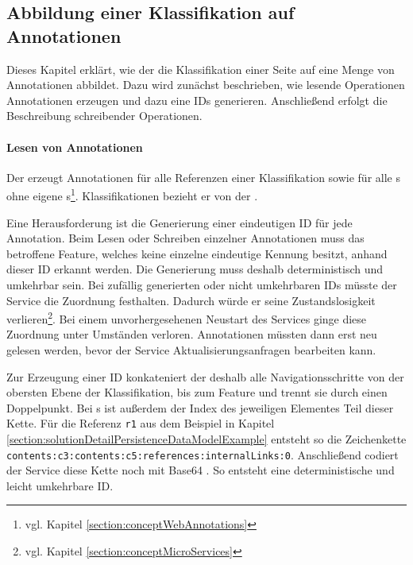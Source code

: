 \subsection{Abbildung einer Klassifikation auf Annotationen}
    \label{section:solutionDetailsAnnotationServiceMapping}
    Dieses Kapitel erklärt, wie der {\annotationService}
    die Klassifikation einer Seite auf eine Menge von Annotationen abbildet.
    Dazu wird zunächst beschrieben, wie lesende Operationen Annotationen
    erzeugen und dazu eine IDs generieren.
    Anschließend erfolgt die Beschreibung schreibender Operationen.

    \paragraph{Lesen von Annotationen}
    Der {\annotationService} erzeugt Annotationen für alle Referenzen einer Klassifikation
    sowie für alle {\contentFeature}s ohne eigene
    {\contentFeature}s\footnote{vgl. Kapitel \ref{section:conceptWebAnnotations}}.
    Klassifikationen bezieht er von der {\classificationStorageAPI}.

    Eine Herausforderung ist die Generierung einer eindeutigen ID für jede Annotation.
    Beim Lesen oder Schreiben einzelner Annotationen muss das betroffene
    Feature, welches keine einzelne eindeutige Kennung besitzt, anhand dieser ID erkannt werden.
    Die Generierung muss deshalb deterministisch und umkehrbar sein.
    Bei zufällig generierten oder nicht umkehrbaren IDs müsste der Service
    die Zuordnung festhalten.
    Dadurch würde er seine Zustandslosigkeit
    verlieren\footnote{vgl. Kapitel \ref{section:conceptMicroServices}}.
    Bei einem unvorhergesehenen Neustart des Services ginge diese Zuordnung unter Umständen verloren.
    Annotationen müssten dann erst neu gelesen werden,
    bevor der Service Aktualisierungsanfragen bearbeiten kann.

    Zur Erzeugung einer ID konkateniert der {\annotationService} deshalb
    alle Navigationsschritte von der obersten Ebene der Klassifikation,
    bis zum Feature und trennt sie durch einen Doppelpunkt.
    Bei {\collectionFeature}s ist außerdem der Index des jeweiligen Elementes Teil dieser Kette.
    Für die Referenz \texttt{r1} aus dem Beispiel in Kapitel \ref{section:solutionDetailPersistenceDataModelExample}
    entsteht so die Zeichenkette \texttt{contents:c3:contents:c5:references:internalLinks:0}.
    Anschließend codiert der Service diese Kette noch mit Base64 \cite{rfc:4648}.
    So entsteht eine deterministische und leicht umkehrbare ID.

